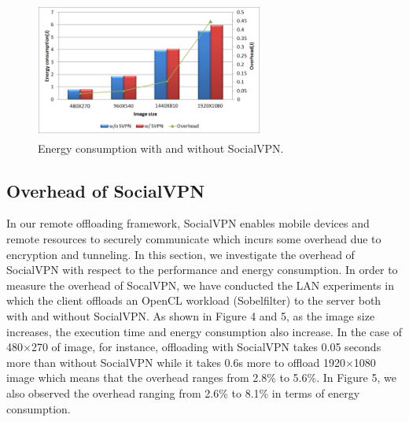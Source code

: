 \documentclass[10pt, conference, compsocconf]{IEEEtran}
\begin{document}
%
\begin{figure}
\centering
\includegraphics[height=4.5cm, width=7.5cm]{Figure/svpn2}
\caption{Energy consumption with and without SocialVPN.
}
\end{figure}
%
\subsection{Overhead of SocialVPN}
%
In our remote offloading framework, SocialVPN enables mobile devices and 
remote resources to securely communicate which incurs some overhead due to 
encryption and tunneling.
%
In this section, we investigate the overhead of SocialVPN with respect to
the performance and energy consumption.
%
In order to measure the overhead of SocalVPN, we have conducted the 
LAN experiments in which the client offloads an OpenCL
workload (Sobelfilter) to the server
both with and without SocialVPN.
%
As shown in Figure 4 and 5, as the image size increases, the execution time 
and energy consumption also increase.
%
In the case of 480$\times$270 of image, for instance, offloading with SocialVPN
takes 0.05 seconds more than without SocialVPN while it takes 0.6s more to
offload 1920$\times$1080 image which means that the overhead ranges from 2.8\% 
to 5.6\%.
%
In Figure 5, we also observed the overhead ranging from 2.6\% to 8.1\% in
terms of energy consumption.
%
\end{document}
